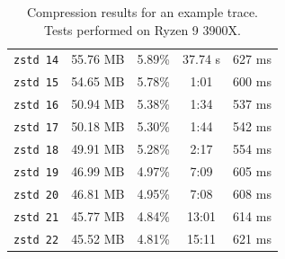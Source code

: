 \documentclass[hidelinks,titlepage,a4paper]{article}
\begin{document}
\begin{table}[h]
\begin{tabular}[h]{c|c|c|c|c}
\texttt{zstd 14} & 55.76 MB & 5.89\% & 37.74 \si{\second} & 627 \si{\milli\second} \\
\texttt{zstd 15} & 54.65 MB & 5.78\% & 1:01 & 600 \si{\milli\second} \\
\texttt{zstd 16} & 50.94 MB & 5.38\% & 1:34 & 537 \si{\milli\second} \\
\texttt{zstd 17} & 50.18 MB & 5.30\% & 1:44 & 542 \si{\milli\second} \\
\texttt{zstd 18} & 49.91 MB & 5.28\% & 2:17 & 554 \si{\milli\second} \\
\texttt{zstd 19} & 46.99 MB & 4.97\% & 7:09 & 605 \si{\milli\second} \\
\texttt{zstd 20} & 46.81 MB & 4.95\% & 7:08 & 608 \si{\milli\second} \\
\texttt{zstd 21} & 45.77 MB & 4.84\% & 13:01 & 614 \si{\milli\second} \\
\texttt{zstd 22} & 45.52 MB & 4.81\% & 15:11 & 621 \si{\milli\second}
\end{tabular}
\caption{Compression results for an example trace. \\ Tests performed on Ryzen 9 3900X.}
\label{compressiontimes}
\end{table}
\end{document}
